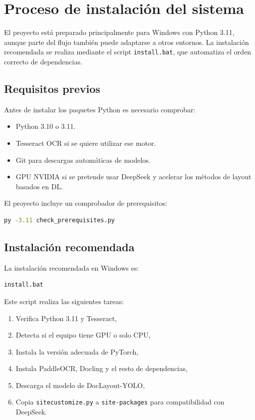 \documentclass[11pt, a4paper]{article}
\begin{document}
\section{Proceso de instalaci\'on del sistema}

El proyecto est\'a preparado principalmente para Windows con Python 3.11, aunque parte del
flujo tambi\'en puede adaptarse a otros entornos. La instalaci\'on recomendada se realiza
mediante el script \texttt{install.bat}, que automatiza el orden correcto de dependencias.

\subsection{Requisitos previos}

Antes de instalar los paquetes Python es necesario comprobar:

\begin{itemize}
    \item Python 3.10 o 3.11.
    \item Tesseract OCR si se quiere utilizar ese motor.
    \item Git para descargas autom\'aticas de modelos.
    \item GPU NVIDIA si se pretende usar DeepSeek y acelerar los m\'etodos de layout basados en DL.
\end{itemize}

El proyecto incluye un comprobador de prerequisitos:

\begin{lstlisting}[language=bash, caption={Verificacion inicial del entorno}]
py -3.11 check_prerequisites.py
\end{lstlisting}

\subsection{Instalaci\'on recomendada}

La instalaci\'on recomendada en Windows es:

\begin{lstlisting}[language=bash, caption={Instalacion automatica recomendada}]
install.bat
\end{lstlisting}

Este script realiza las siguientes tareas:

\begin{enumerate}
    \item Verifica Python 3.11 y Tesseract,
    \item Detecta si el equipo tiene GPU o solo CPU,
    \item Instala la versi\'on adecuada de PyTorch,
    \item Instala PaddleOCR, Docling y el resto de dependencias,
    \item Descarga el modelo de DocLayout-YOLO,
    \item Copia \texttt{sitecustomize.py} a \texttt{site-packages} para compatibilidad con DeepSeek.
\end{enumerate}
\end{document}
